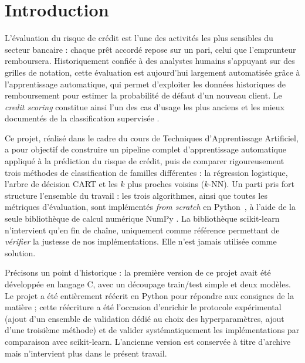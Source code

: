 
\section{Introduction}
\label{sec:introduction}

L'évaluation du risque de crédit est l'une des activités les plus sensibles du
secteur bancaire : chaque prêt accordé repose sur un pari, celui que l'emprunteur
remboursera. Historiquement confiée à des analystes humains s'appuyant sur des
grilles de notation, cette évaluation est aujourd'hui largement automatisée grâce
à l'apprentissage automatique, qui permet d'exploiter les données historiques de
remboursement pour estimer la probabilité de défaut d'un nouveau client. Le
\emph{credit scoring} constitue ainsi l'un des cas d'usage les plus anciens et les
mieux documentés de la classification supervisée \cite{hosmer2000logistic}.

Ce projet, réalisé dans le cadre du cours de Techniques d'Apprentissage
Artificiel, a pour objectif de construire un pipeline complet d'apprentissage
automatique appliqué à la prédiction du risque de crédit, puis de comparer
rigoureusement trois méthodes de classification de familles différentes : la
régression logistique, l'arbre de décision CART et les $k$ plus proches voisins
($k$-NN). Un parti pris fort structure l'ensemble du travail : les trois
algorithmes, ainsi que toutes les métriques d'évaluation, sont implémentés
\emph{from scratch} en Python~\cite{python_psf}, à l'aide de la seule
bibliothèque de calcul numérique NumPy \cite{harris2020numpy}. La bibliothèque scikit-learn
\cite{pedregosa2011sklearn} n'intervient qu'en fin de chaîne, uniquement comme
référence permettant de \emph{vérifier} la justesse de nos implémentations. Elle
n'est jamais utilisée comme solution.

Précisons un point d'historique : la première version de ce projet avait été
développée en langage C, avec un découpage train/test simple et deux modèles.
Le projet a été entièrement réécrit en Python pour répondre aux consignes de la
matière ; cette réécriture a été l'occasion d'enrichir le protocole expérimental
(ajout d'un ensemble de validation dédié au choix des hyperparamètres, ajout
d'une troisième méthode) et de valider systématiquement les implémentations par
comparaison avec scikit-learn. L'ancienne version est conservée à titre d'archive
mais n'intervient plus dans le présent travail.

